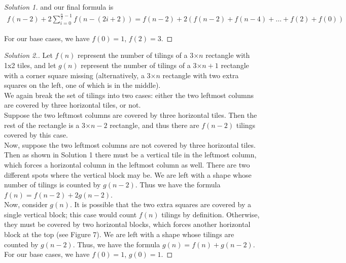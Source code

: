 \documentclass[12pt]{article}
\begin{document}
\begin{myprob}{}{}
\begin{proof}[Solution 1]
            and our final formula is
            \begin{align*}
                f(n-2)+2\sum_{i=0}^{\frac{n}{2}-1}f(n-(2i+2))=f(n-2)+2(f(n-2)+f(n-4)+\dots+f(2)+f(0))
            \end{align*}

            For our base cases, we have $f(0)=1$, $f(2)=3$.
        \end{proof}
        \begin{proof}[Solution 2.]
            Let $f(n)$ represent the number of tilings of a 3$\times n$ rectangle with 1x2 tiles, and let $g(n)$ represent the number of tilings of a 3$\times n+1$ rectangle with a corner square missing (alternatively, a 3$\times n$ rectangle with two extra squares on the left, one of which is in the middle).\\

            We again break the set of tilings into two cases: either the two leftmost columns are covered by three horizontal tiles, or not.\\

            Suppose the two leftmost columns are covered by three horizontal tiles. Then the rest of the rectangle is a 3$\times n-2$ rectangle, and thus there are $f(n-2)$ tilings covered by this case.\\

            Now, suppose the two leftmost columns are not covered by three horizontal tiles. Then as shown in Solution 1 there must be a vertical tile in the leftmost column, which forces a horizontal column in the leftmost column as well. There are two different spots where the vertical block may be. We are left with a shape whose number of tilings is counted by $g(n-2)$. Thus we have the formula $f(n)=f(n-2)+2g(n-2)$.\\

            Now, consider $g(n)$. It is possible that the two extra squares are covered by a single vertical block; this case would count $f(n)$ tilings by definition. Otherwise, they must be covered by two horizontal blocks, which forces another horizontal block at the top (see Figure 7). We are left with a shape whose tilings are counted by $g(n-2)$. Thus, we have the formula $g(n)=f(n)+g(n-2)$.\\

            For our base cases, we have $f(0)=1$, $g(0)=1$.
        \end{proof}
    \end{myprob}
\end{document}
